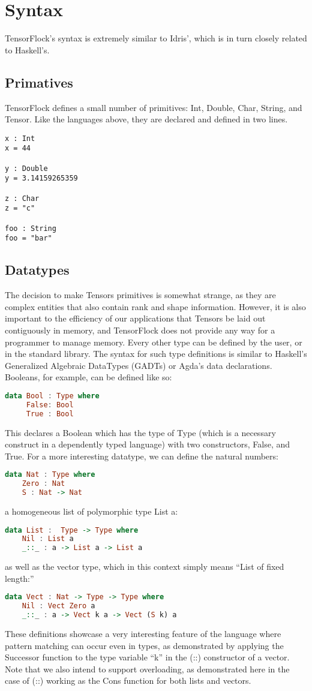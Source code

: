 \documentclass[12pt]{article}
\begin{document}
\section{Syntax}
TensorFlock's syntax is extremely similar to Idris', which is in turn closely related to Haskell's.

\subsection{Primatives}
TensorFlock defines a small number of primitives: Int, Double, Char, String, and Tensor. Like the languages above, they are declared and defined in two lines.
\begin{lstlisting}
x : Int
x = 44

y : Double
y = 3.14159265359

z : Char
z = "c"

foo : String
foo = "bar"
\end{lstlisting}
\subsection{Datatypes}
The decision to make Tensors primitives is somewhat strange, as they are complex entities that also contain rank and shape information. However, it is also important to the efficiency of our applications that Tensors be laid out contiguously in memory, and TensorFlock does not provide any way for a programmer to manage memory. 
Every other type can be defined by the user, or in the standard library. The syntax for such type definitions is similar to Haskell's Generalized Algebraic DataTypes (GADTs) or Agda's data declarations. Booleans, for example, can be defined like so:
\begin{lstlisting}[language=Haskell]
data Bool : Type where
     False: Bool
     True : Bool
\end{lstlisting}
This declares a Boolean which has the type of Type (which is a necessary construct in a dependently typed language) with two constructors, False, and True. For a more interesting datatype, we can define the natural numbers:
\begin{lstlisting}[language=Haskell]
data Nat : Type where
    Zero : Nat
    S : Nat -> Nat
\end{lstlisting}
\pagebreak
 a homogeneous list of polymorphic type List a:
\begin{lstlisting}[language=Haskell]
data List :  Type -> Type where
    Nil : List a    
    _::_ : a -> List a -> List a
\end{lstlisting}
as well as the vector type, which in this context simply means ``List of fixed length:''
\begin{lstlisting}[language=Haskell]
data Vect : Nat -> Type -> Type where
    Nil : Vect Zero a
    _::_ : a -> Vect k a -> Vect (S k) a
\end{lstlisting}
These definitions showcase a very interesting feature of the language where pattern matching can occur even in types, as demonstrated by applying the Successor function to the type variable ``k'' in the (::) constructor of a vector. Note that we also intend to support overloading, as demonstrated here in the case of (::) working as the Cons function for both lists and vectors.
\end{document}
